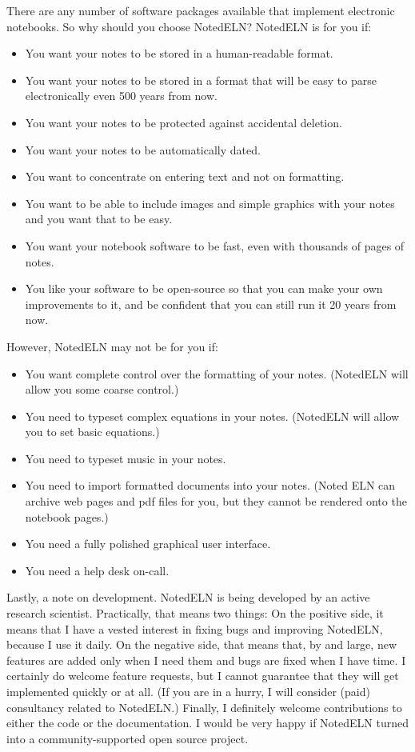 \documentclass[11pt]{report}
\begin{document}
There are any
number of software packages available that implement electronic
notebooks. So why should you choose NotedELN? NotedELN is for you if:
\begin{itemize}
  \item You want your notes to be stored in a human-readable format.
  \item You want your notes to be stored in a format that will be easy to
    parse electronically even 500 years from now.
  \item You want your notes to be protected against accidental
    deletion.
  \item You want your notes to be automatically dated.
  \item You want to concentrate on entering text and not on
    formatting.
  \item You want to be able to include images and simple graphics with
    your notes and you want that to be easy.
  \item You want your notebook software to be fast, even with thousands
    of pages of notes.
  \item You like your software to be open-source so that you can make
    your own improvements to it, and be confident that you can still
    run it 20 years from now.
\end{itemize}

\noindent However, NotedELN may not be for you if:
\begin{itemize}
  \item You want complete control over the formatting of your notes.
    (NotedELN will allow you some coarse control.)
  \item You need to typeset complex equations in your notes. (NotedELN
    will allow you to set basic equations.)
  \item You need to typeset music in your notes.
  \item You need to import formatted documents into your notes. (Noted
    ELN
    can archive web pages and pdf files for you, but they cannot be
    rendered onto the notebook pages.)
  \item You need a fully polished graphical user interface.
  \item You need a help desk on-call.
\end{itemize}
\noindent Lastly, a note on development. NotedELN is being developed by an
active research scientist. Practically, that means two things: On the
positive side, it means that I have a vested interest in fixing bugs
and improving NotedELN, because I use it daily. On the negative side, that
means that, by and large, new features are added only when I need them
and bugs are fixed when I have time. I certainly do welcome feature
requests, but I cannot guarantee that they will get implemented
quickly or at all. (If you are in a hurry, I will consider (paid)
consultancy related to NotedELN.) Finally, I definitely welcome
contributions to either the code or the documentation. I would be very
happy if NotedELN turned into a community-supported open source project.
\end{document}
